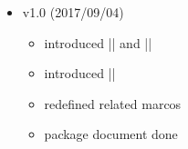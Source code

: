 \documentclass[a4paper,amsmath]{oblivoir}
\renewcommand \cmd [1]
{
  \texorpdfstring 
    { \cmdprint {#1} }
    { \textbackslash \cs_to_str:N #1 }
}
\newcommand\xw[1]{\cmd{#1}}
\begin{document}
\begin{itemize}
\item v1.0 (2017/09/04)
  \begin{itemize}
  \item introduced |\cntmlevdist| and |\cntmsibdist|
  \item introduced |\cntmdistance|
  \item redefined related marcos
  \item package document done
  \end{itemize}

\end{itemize}
\end{document}
